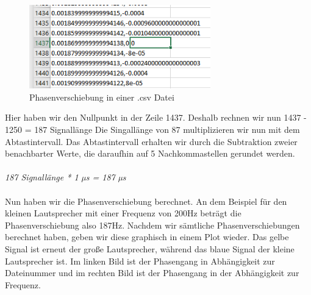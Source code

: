 \documentclass[12pt, oneside, a4paper, \docLanguage]{report}
\begin{document}
\begin{figure}[H]
	\centering\small
	\includegraphics[width=0.7\textwidth]{media/excel.png}
	\caption{Phasenverschiebung in einer .csv Datei}
	\label{img:Phasenverschiebung in einer .csv Datei}
\end{figure}
\newpage
Hier haben wir den Nullpunkt in der Zeile 1437. Deshalb rechnen wir nun 1437 - 1250 = 187 Signallänge
Die Singallänge von 87 multiplizieren wir nun mit dem Abtastintervall. Das Abtastintervall erhalten wir durch die Subtraktion zweier benachbarter Werte, die daraufhin auf 5 Nachkommastellen gerundet werden.
\\~\\
\textit{187 Signallänge *  1 µs  = 187 µs} 
\\~\\
Nun haben wir die Phasenverschiebung berechnet. An dem Beispiel für den kleinen Lautsprecher mit einer Frequenz von 200Hz beträgt die Phasenverschiebung also 187Hz.
Nachdem wir sämtliche Phasenverschiebungen berechnet haben, geben wir diese graphisch in einem Plot wieder.
Das gelbe Signal ist erneut der große Lautsprecher, während das blaue Signal der kleine Lautsprecher ist.
Im linken Bild ist der Phasengang in Abhängigkeit zur Dateinummer und im rechten Bild ist der Phasengang in der Abhängigkeit zur Frequenz.
\end{document}
